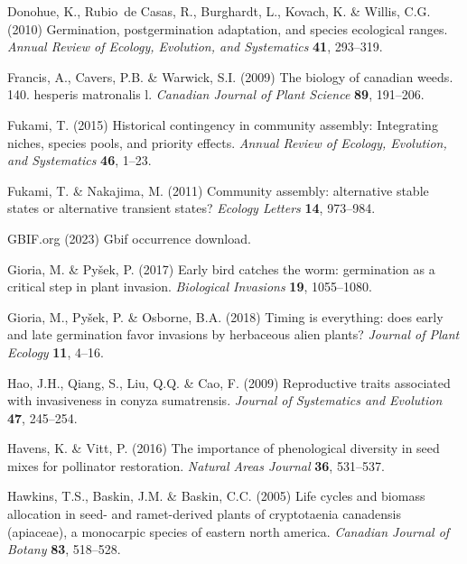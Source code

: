 \documentclass{article}[11pt]
\begin{document}
\begin{thebibliography}{62}
Donohue, K., Rubio~de Casas, R., Burghardt, L., Kovach, K. \& Willis, C.G.
  (2010) Germination, postgermination adaptation, and species ecological
  ranges. \emph{Annual Review of Ecology, Evolution, and Systematics}
  \textbf{41}, 293--319.

Francis, A., Cavers, P.B. \& Warwick, S.I. (2009) The biology of canadian
  weeds. 140. hesperis matronalis l. \emph{Canadian Journal of Plant Science}
  \textbf{89}, 191--206.

Fukami, T. (2015) Historical contingency in community assembly: Integrating
  niches, species pools, and priority effects. \emph{Annual Review of Ecology,
  Evolution, and Systematics} \textbf{46}, 1--23.

Fukami, T. \& Nakajima, M. ({2011}) {Community assembly: alternative stable
  states or alternative transient states?} \emph{Ecology Letters}
  \textbf{{14}}, {973--984}.

{GBIF.org} (2023) Gbif occurrence download.

Gioria, M. \& Py{\v s}ek, P. (2017) Early bird catches the worm: germination as
  a critical step in plant invasion. \emph{Biological Invasions} \textbf{19},
  1055--1080.

Gioria, M., Py{\v s}ek, P. \& Osborne, B.A. (2018) Timing is everything: does
  early and late germination favor invasions by herbaceous alien plants?
  \emph{Journal of Plant Ecology} \textbf{11}, 4--16.

Hao, J.H., Qiang, S., Liu, Q.Q. \& Cao, F. (2009) Reproductive traits
  associated with invasiveness in conyza sumatrensis. \emph{Journal of
  Systematics and Evolution} \textbf{47}, 245--254.

Havens, K. \& Vitt, P. (2016) The importance of phenological diversity in seed
  mixes for pollinator restoration. \emph{Natural Areas Journal} \textbf{36},
  531--537.

Hawkins, T.S., Baskin, J.M. \& Baskin, C.C. (2005) Life cycles and biomass
  allocation in seed- and ramet-derived plants of cryptotaenia canadensis
  (apiaceae), a monocarpic species of eastern north america. \emph{Canadian
  Journal of Botany} \textbf{83}, 518--528.


\end{thebibliography}
\end{document}
